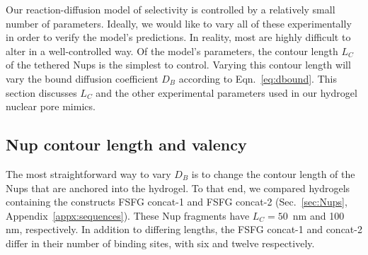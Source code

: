 Our reaction-diffusion model of selectivity is controlled by a relatively small number of parameters.  Ideally, we would like to vary all of these experimentally in order to verify the model's predictions.  In reality, most are highly difficult to alter in a well-controlled way.  Of the model's parameters, the contour length $L_C$ of the tethered Nups is the simplest to control.  Varying this contour length will vary the bound diffusion coefficient $D_B$ according to Eqn.~\ref{eq:dbound}.  This section discusses $L_C$ and the other experimental parameters used in our hydrogel nuclear pore mimics.

\subsection{Nup contour length and valency}

The most straightforward way to vary $D_B$ is to change the contour length of the Nups that are anchored into the hydrogel.  To that end, we compared hydrogels containing the constructs FSFG concat-1 and FSFG concat-2 (Sec.~\ref{sec:Nups}, Appendix~\ref{appx:sequences}).  These Nup fragments have $L_C = 50$~nm and 100 nm, respectively.  %
In addition to differing lengths, the FSFG concat-1 and concat-2 differ in their number of binding sites, with six and twelve respectively.  %

